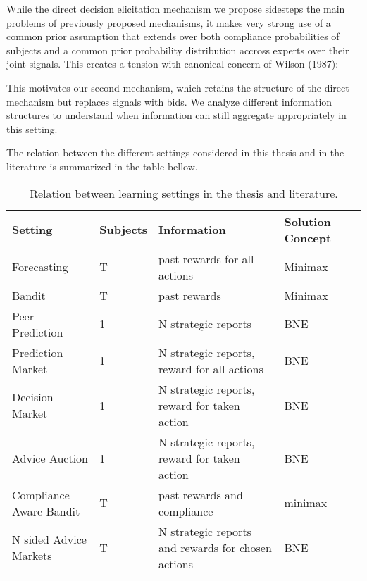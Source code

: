 While the direct decision elicitation mechanism we propose sidesteps the main problems of previously proposed mechanisms, it makes very strong use of a common prior assumption that extends over both compliance probabilities of subjects and a common prior probability distribution accross experts over their joint signals. This creates a tension with canonical concern of Wilson (1987):


This motivates our second mechanism, which retains the structure of the direct mechanism but replaces signals with bids. We analyze different information structures to understand when information can still aggregate appropriately in this setting.

The relation between the different settings considered in this thesis and in the literature is summarized in the table bellow.

\begin{table}
	\begin{tabular}{lllll}
		\toprule
		Setting & Subjects & Information & Solution Concept\\
		\midrule
		Forecasting & T  & past rewards for all actions & Minimax  \\
		Bandit & T  & past rewards &  Minimax  \\
		Peer Prediction & 1 & N strategic reports & BNE \\
		Prediction Market & 1 & N strategic reports, reward for all actions &  BNE\\
		Decision Market & 1 & N strategic reports, reward for taken action & BNE  \\
		Advice Auction  & 1 & N strategic reports, reward for taken action & BNE  \\
		Compliance Aware Bandit & T  & past rewards and compliance & minimax \\
		N sided Advice Markets  & T  &  N strategic reports and rewards for chosen actions & BNE  \\
		\bottomrule
	\end{tabular}
	\caption{Relation between learning settings in the thesis and literature.}
\end{table}


